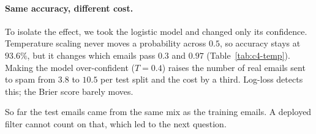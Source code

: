 \paragraph{Same accuracy, different cost.}
To isolate the effect, we took the logistic model and changed only its confidence. Temperature
scaling never moves a probability across $0.5$, so accuracy stays at $93.6\%$, but it changes which
emails pass $0.3$ and $0.97$ (Table~\ref{tab:c4-temp}). Making the model over-confident ($T=0.4$)
raises the number of real emails sent to spam from $3.8$ to $10.5$ per test split and the cost by a
third. Log-loss detects this; the Brier score barely moves.

\begin{table}[!htbp]
\centering\footnotesize\setlength{\tabcolsep}{4pt}

\caption{Logistic regression on Spambase after temperature scaling (mean $\pm$ standard error).}
\label{tab:c4-temp}
\end{table}

So far the test emails came from the same mix as the training emails. A deployed filter cannot count
on that, which led to the next question.
